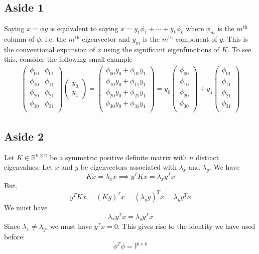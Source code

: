 \documentclass{article}
\newcommand{\beq}{\begin{equation}}
\newcommand{\eeq}{\end{equation}}
\newcommand{\ber}{\begin{eqnarray}}
\newcommand{\eer}{\end{eqnarray}}
\begin{document}
\subsection{Aside 1}
Saying $x=\phi{y}$ is equivalent to saying $x=y_{1}\phi_{1}+\cdots+y_{k}\phi_{k}$ where $\phi_m$ is the $m^{\text{th}}$ column of $\phi$, i.e. the $m^{\text{th}}$ eigenvector and $y_m$ is the $m^{\text{th}}$ component of $y$. This is the conventional expansion of $x$ using the significant eigenfunctions of $K$. To see this, consider the following small example
\ber
\begin{pmatrix}
  \phi_{00} & \phi_{01} \\
  \phi_{10} & \phi_{11} \\
  \phi_{20} & \phi_{21} \\
  \phi_{30} & \phi_{31} \\
\end{pmatrix}
\begin{pmatrix}
  y_0 \\
  y_1
\end{pmatrix}
=\begin{pmatrix}
  \phi_{00}y_0 + \phi_{01}y_1 \\
  \phi_{10}y_0 + \phi_{11}y_1 \\
  \phi_{20}y_0 + \phi_{21}y_1 \\
  \phi_{30}y_0 + \phi_{31}y_1\\
\end{pmatrix}
=y_0\begin{pmatrix}
  \phi_{00}  \\
  \phi_{10}  \\
  \phi_{20}  \\
  \phi_{30}  \\
\end{pmatrix}
+
y_1\begin{pmatrix}
  \phi_{01}  \\
  \phi_{11}  \\
  \phi_{21}  \\
  \phi_{31}  \\
\end{pmatrix}
\eer
\subsection{Aside 2}
Let $K\in\mathbb{R}^{n\times{n}} $ be a symmetric positive definite matrix with $n$ distinct eigenvalues. Let $x$ and $y$ be eigenvectors associated with $\lambda_x$ and $\lambda_y$. We have
\beq
Kx=\lambda_xx \implies y^TKx = \lambda_xy^Tx
\eeq
But,
\beq
y^TKx = (Ky)^Tx = (\lambda_yy)^Tx = \lambda_yy^Tx
\eeq
We must have
\beq
\lambda_xy^Tx = \lambda_yy^Tx
\eeq
Since $\lambda_x\ne\lambda_y$, we must have $y^Tx=0$.
This gives rise to the identity we have used before:
\beq
\phi^T\phi = \mathbb{I}^{k\times{k}}
\eeq
\end{document}
